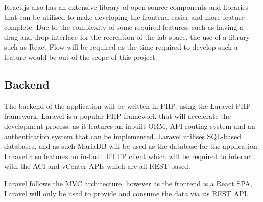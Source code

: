 React.js also has an extensive library of open-source components and libraries that can be utilised to make developing the frontend easier and more feature complete. Due to the complexity of some required features, such as having a drag-and-drop interface for the recreation of the lab space, the use of a library such as React Flow will be required as the time required to develop such a feature would be out of the scope of this project.

\subsection{Backend}
\label{design:web-application:backend}
The backend of the application will be written in PHP, using the Laravel PHP framework. Laravel is a popular PHP framework that will accelerate the development process, as it features an inbuilt ORM, API routing system and an authentication system that can be implemented. Laravel utilises SQL-based databases, and as such MariaDB will be used as the database for the application. Laravel also features an in-built HTTP client which will be required to interact with the ACI and vCenter APIs which are all REST-based.

Laravel follows the MVC architecture, however as the frontend is a React SPA, Laravel will only be used to provide and consume the data via its REST API.
